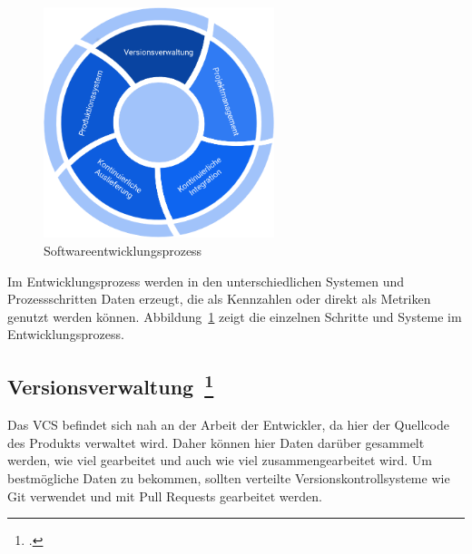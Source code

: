 \begin{savenotes}
  \begin{figure}[H] 
    \centering
       \includegraphics[width=0.6\textwidth]{img/software-development-lifecycle.png}
    \caption[Softwareentwicklungsprozess]{Softwareentwicklungsprozess~\label{fig:sdlc}}
  \end{figure}
\end{savenotes}

Im Entwicklungsprozess werden in den unterschiedlichen Systemen und Prozessschritten Daten erzeugt, die als Kennzahlen oder direkt als Metriken genutzt werden können.
Abbildung~\ref{fig:sdlc} zeigt die einzelnen Schritte und Systeme im Entwicklungsprozess.

\newpage
\subsection[Versionsverwaltung]{Versionsverwaltung~\footcite[vgl.][S.62ff]{davis_agile_2015}}

Das \ac{VCS} befindet sich nah an der Arbeit der Entwickler, da hier der Quellcode des Produkts verwaltet wird.
Daher können hier Daten darüber gesammelt werden, wie viel gearbeitet und auch wie viel zusammengearbeitet wird.
Um bestmögliche Daten zu bekommen, sollten verteilte Versionskontrollsysteme wie Git verwendet und mit Pull Requests gearbeitet werden.

